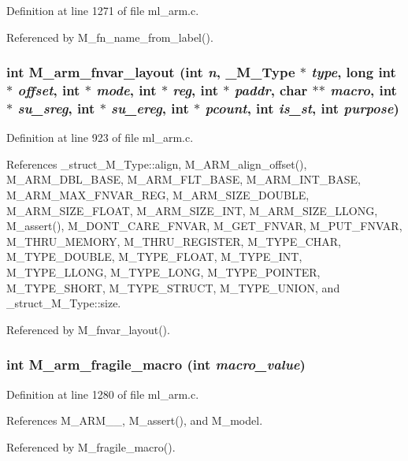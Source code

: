 Definition at line 1271 of file ml\_\-arm.c.

Referenced by M\_\-fn\_\-name\_\-from\_\-label().
\subsubsection{\setlength{\rightskip}{0pt plus 5cm}int M\_\-arm\_\-fnvar\_\-layout (int {\em n}, \bf{\_\-M\_\-Type} $\ast$ {\em type}, long int $\ast$ {\em offset}, int $\ast$ {\em mode}, int $\ast$ {\em reg}, int $\ast$ {\em paddr}, char $\ast$$\ast$ {\em macro}, int $\ast$ {\em su\_\-sreg}, int $\ast$ {\em su\_\-ereg}, int $\ast$ {\em pcount}, int {\em is\_\-st}, int {\em purpose})}\label{m__arm_8h_c24ee6375154bd9079eb8dec8c7ff308}




Definition at line 923 of file ml\_\-arm.c.

References \_\-struct\_\-M\_\-Type::align, M\_\-ARM\_\-align\_\-offset(), M\_\-ARM\_\-DBL\_\-BASE, M\_\-ARM\_\-FLT\_\-BASE, M\_\-ARM\_\-INT\_\-BASE, M\_\-ARM\_\-MAX\_\-FNVAR\_\-REG, M\_\-ARM\_\-SIZE\_\-DOUBLE, M\_\-ARM\_\-SIZE\_\-FLOAT, M\_\-ARM\_\-SIZE\_\-INT, M\_\-ARM\_\-SIZE\_\-LLONG, M\_\-assert(), M\_\-DONT\_\-CARE\_\-FNVAR, M\_\-GET\_\-FNVAR, M\_\-PUT\_\-FNVAR, M\_\-THRU\_\-MEMORY, M\_\-THRU\_\-REGISTER, M\_\-TYPE\_\-CHAR, M\_\-TYPE\_\-DOUBLE, M\_\-TYPE\_\-FLOAT, M\_\-TYPE\_\-INT, M\_\-TYPE\_\-LLONG, M\_\-TYPE\_\-LONG, M\_\-TYPE\_\-POINTER, M\_\-TYPE\_\-SHORT, M\_\-TYPE\_\-STRUCT, M\_\-TYPE\_\-UNION, and \_\-struct\_\-M\_\-Type::size.

Referenced by M\_\-fnvar\_\-layout().
\subsubsection{\setlength{\rightskip}{0pt plus 5cm}int M\_\-arm\_\-fragile\_\-macro (int {\em macro\_\-value})}\label{m__arm_8h_c68d55e338b499ec3e1f125d4d6de3b7}




Definition at line 1280 of file ml\_\-arm.c.

References M\_\-ARM\_\_, M\_\-assert(), and M\_\-model.

Referenced by M\_\-fragile\_\-macro().
